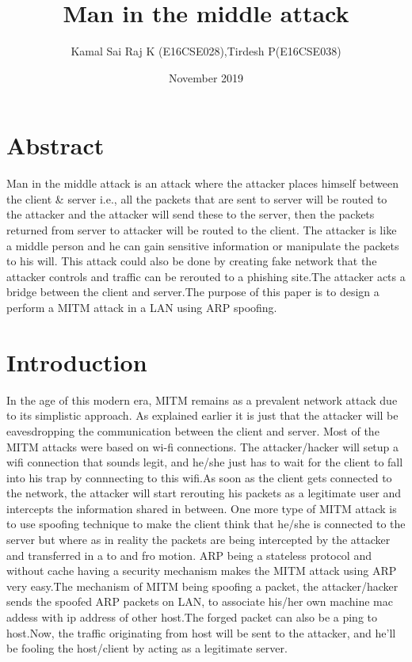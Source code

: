 \documentclass[11pt]{article}
\title{Man in the middle attack}
\author{Kamal Sai Raj K (E16CSE028),Tirdesh P(E16CSE038)}
\date{November 2019}
\begin{document}
\maketitle

\section{Abstract}
Man in the middle attack is an attack where the attacker places himself between the client & server i.e., all the packets that are sent to server will be routed to  the attacker and the attacker will send these to the server, then the packets returned from server to attacker will be routed to the client. The attacker is like a middle person and he can gain sensitive information or manipulate the packets to his will. This attack could also be done by creating fake network that the attacker controls and traffic can be rerouted to a phishing site.The attacker acts a bridge between the client and server.The purpose of this paper is to design a perform a MITM attack in a LAN using ARP spoofing.
\section{Introduction}
In the age of this modern era, MITM remains as a prevalent network attack due to its simplistic approach. As explained earlier it is just that the attacker will be eavesdropping the communication between the client and server. Most of the MITM attacks were based on wi-fi connections. The attacker/hacker will setup a wifi connection that sounds legit, and he/she just has to wait for the client  to fall into his trap by connnecting to this wifi.As soon as the client gets connected to the network, the attacker will start rerouting his packets as a legitimate user and intercepts the information shared in between.
One more type of MITM attack is to use spoofing technique to make the client think that he/she is connected to the server but where as in reality the packets are being intercepted by the attacker and transferred in a to and fro motion.
ARP being a stateless protocol and without cache having a security mechanism makes the MITM attack using ARP very easy.The mechanism of MITM being spoofing a packet, the attacker/hacker sends the spoofed ARP packets on LAN, to associate his/her own machine mac addess with ip address of other host.The forged packet can also be a ping to host.Now, the traffic originating from host will be sent to the attacker, and he'll be fooling the host/client by acting as a legitimate server.
\end{document}
